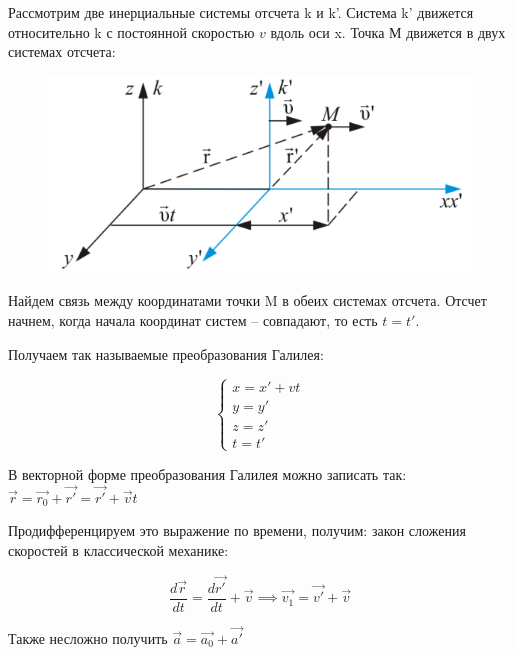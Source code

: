 Рассмотрим две инерциальные
системы отсчета k и k'. Система k' движется
относительно k с постоянной скоростью $v$
вдоль оси x. Точка М движется в двух
системах отсчета:
\begin{figure}[h]
    \centering
    \includegraphics[width=0.7\linewidth]{imgs/q5i3.png}
\end{figure}

Найдем связь между координатами
точки M в обеих системах отсчета. Отсчет
начнем, когда начала координат систем –
совпадают, то есть $t = t'$.

Получаем так называемые преобразования Галилея:

$$\begin{cases}
    x = x' + vt \\ 
    y = y' \\
    z = z' \\
    t = t'
\end{cases}$$

В векторной форме преобразования Галилея можно записать так: $\vec{r} = \vec{r_0} + \vec{r'} = \vec{r'} + \vec{v}t$

Продифференцируем это выражение по времени, получим: закон сложения скоростей в классической механике:

$$\frac{d\vec{r}}{dt} = \frac{d\vec{r'}}{dt} + \vec{v} \implies \vec{v_1} = \vec{v'} + \vec{v}$$

Также несложно получить $\vec{a} = \vec{a_0} + \vec{a'}$ 